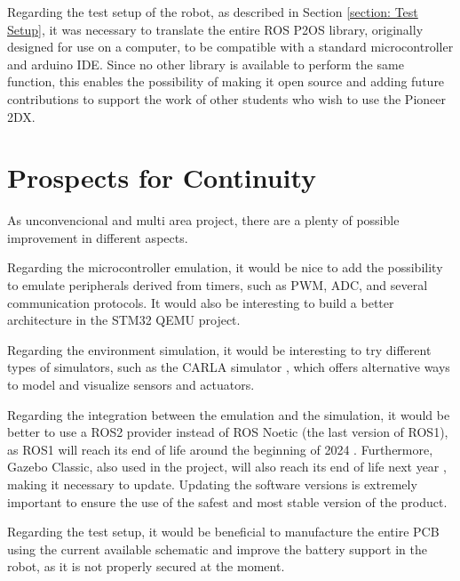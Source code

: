 \documentclass[../monografia.tex]{subfiles}
\begin{document}
Regarding the test setup of the robot, as described in Section \ref{section: Test Setup}, it was necessary to translate the entire ROS P2OS library, originally designed for use on a computer, to be compatible with a standard microcontroller and arduino IDE. Since no other library is available to perform the same function, this enables the possibility of making it open source and adding future contributions to support the work of other students who wish to use the Pioneer 2DX.


\section{Prospects for Continuity}

As unconvencional and multi area project, there are a plenty of possible improvement in different aspects.

Regarding the microcontroller emulation, it would be nice to add the possibility to emulate peripherals derived from timers, such as PWM, ADC, and several communication protocols. It would also be interesting to build a better architecture in the STM32 QEMU project.

Regarding the environment simulation, it would be interesting to try different types of simulators, such as the CARLA simulator \cite{carla_24}, which offers alternative ways to model and visualize sensors and actuators.

Regarding the integration between the emulation and the simulation, it would be better to use a ROS2 provider instead of ROS Noetic (the last version of ROS1), as ROS1 will reach its end of life around the beginning of 2024 \cite{ros_news_24}. Furthermore, Gazebo Classic, also used in the project, will also reach its end of life next year \cite{gazebo_end_of_life_24}, making it necessary to update. Updating the software versions is extremely important to ensure the use of the safest and most stable version of the product.

Regarding the test setup, it would be beneficial to manufacture the entire PCB using the current available schematic and improve the battery support in the robot, as it is not properly secured at the moment.

\end{document}
